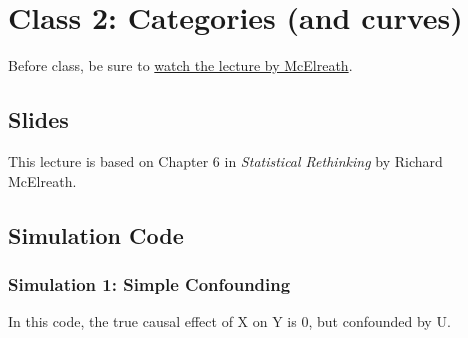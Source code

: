 \documentclass[
]{book}
\begin{document}
\section{Class 2: Categories (and curves)}\label{class-2-categories-and-curves-1}

Before class, be sure to \href{https://www.youtube.com/watch?v=F0N4b7K_iYQ&list=PLDcUM9US4XdPz-KxHM4XHt7uUVGWWVSus&index=6}{watch the lecture by McElreath}.

\subsection{Slides}\label{slides-4}

This lecture is based on Chapter 6 in \emph{Statistical Rethinking} by Richard McElreath.

\subsection{Simulation Code}\label{simulation-code}

\subsubsection{Simulation 1: Simple Confounding}\label{simulation-1-simple-confounding}

In this code, the true causal effect of X on Y is 0, but confounded by U.
\end{document}
